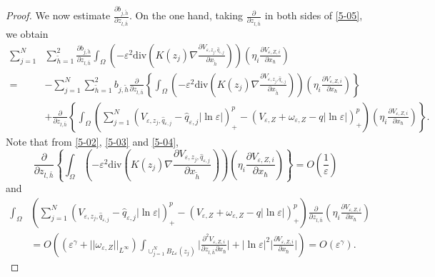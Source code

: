 \documentclass[12pt,reqno]{amsart}
\numberwithin{equation}{section}
\theoremstyle{definition}
\theoremstyle{remark}
\begin{document}
\begin{proof}
We now estimate  $  \frac{\partial b_{j,\tilde{h}}}{\partial z_{l,\bar{h}}} $. On the one hand, taking $ \frac{\partial}{\partial z_{l,\bar{h}}} $ in both sides of \eqref{5-05}, we obtain
\begin{equation}\label{5-07}
\begin{split}
\sum_{j=1}^N&\sum_{\tilde{h}=1}^2\frac{\partial b_{j,\tilde{h}}}{\partial z_{l,\bar{h}}}\int_\Omega\left( -\varepsilon^2\text{div}\left (K(z_j)\nabla   \frac{\partial V_{\varepsilon, z_j, \hat{q}_{\varepsilon,j}}}{\partial x_{\tilde{h}}}\right )\right)\left( \eta_i\frac{\partial V_{\varepsilon, Z,i}}{\partial x_\hbar}\right)\\
=&-\sum_{j=1}^N\sum_{\tilde{h}=1}^2b_{j,\tilde{h}} \frac{\partial }{\partial z_{l,\bar{h}}}\left\{  \int_\Omega\left( -\varepsilon^2\text{div}\left (K(z_j)\nabla   \frac{\partial V_{\varepsilon, z_j, \hat{q}_{\varepsilon,j}}}{\partial x_{\tilde{h}}}\right )\right)\left( \eta_i\frac{\partial V_{\varepsilon, Z,i}}{\partial x_\hbar}\right)\right\} \\
&+\frac{\partial }{\partial z_{l,\bar{h}}}\left\{\int_\Omega\left( \sum_{j=1}^N\left (V_{\varepsilon, z_j, \hat{q}_{\varepsilon,j}}-\hat{q}_{\varepsilon,j}|\ln\varepsilon|\right )^{p}_+-\left (V_{\varepsilon,Z}+\omega_{\varepsilon,Z}-q|\ln\varepsilon|\right )^{p}_+\right) \left( \eta_i\frac{\partial V_{\varepsilon, Z,i}}{\partial x_\hbar}\right)\right\}.
\end{split}
\end{equation}
Note that from \eqref{5-02}, \eqref{5-03} and \eqref{5-04},
\begin{equation*}
 \frac{\partial }{\partial z_{l,\bar{h}}}\left\{  \int_\Omega\left( -\varepsilon^2\text{div}\left (K(z_j)\nabla   \frac{\partial V_{\varepsilon, z_j, \hat{q}_{\varepsilon,j}}}{\partial x_{\tilde{h}}}\right )\right)\left( \eta_i\frac{\partial V_{\varepsilon, Z,i}}{\partial x_\hbar}\right)\right\}=O\left( \frac{1}{\varepsilon}\right)
\end{equation*}
and
\begin{equation*}
\begin{split}
 \int_\Omega&\left( \sum_{j=1}^N\left (V_{\varepsilon, z_j, \hat{q}_{\varepsilon,j}}-\hat{q}_{\varepsilon,j}|\ln\varepsilon|\right )^{p}_+-\left (V_{\varepsilon,Z}+\omega_{\varepsilon,Z}-q|\ln\varepsilon|\right )^{p}_+\right)  \frac{\partial }{\partial z_{l,\bar{h}}}\left( \eta_i\frac{\partial V_{\varepsilon, Z,i}}{\partial x_\hbar}\right) \\
 &=O\left (\left ( \varepsilon^\gamma+||\omega_{\varepsilon,Z}||_{L^\infty}\right )\int_{\cup_{j=1}^NB_{L\varepsilon}(z_j)}\bigg|\frac{\partial^2 V_{\varepsilon, Z,i}}{\partial z_{l,\bar{h}}\partial x_\hbar} \bigg|+|\ln\varepsilon|^2\bigg|\frac{\partial V_{\varepsilon, Z,i}}{\partial x_\hbar} \bigg|\right )=O\left (\varepsilon^{\gamma}\right ).

\end{split}
\end{equation*}
\end{proof}
\end{document}
